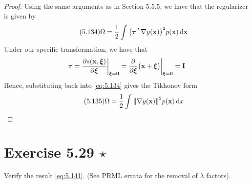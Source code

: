 \vspace{1em}

\begin{proof}
    Using the same arguments as in Section 5.5.5, we have that the regularizer
    is given by
    \begin{equation}\label{eq:5.134}\tag{5.134}
        \Omega = \frac{1}{2} \int_{}^{} \big(\bm{\tau}^T 
        \nabla y(\mathbf{x})\big)^2 p(\mathbf{x}) \mathop{}\!\mathrm{d} \mathbf{x}
    \end{equation}
    Under our specific transformation, we have that
    \[
        \bm{\tau} = \pdv{s(\mathbf{x}, \bm{\xi})}{\bm{\xi}} \bigg|_{\bm{\xi} = \bm{0}}
        = \pdv{\bm{\xi}} \big(\mathbf{x} + \bm{\xi}\big) \bigg|_{\bm{\xi} = \bm{0}}
        = \mathbf{I}
    \] 
    Hence, substituting back into \eqref{eq:5.134} gives the Tikhonov form
    \begin{equation}\label{eq:5.135}\tag{5.135}
        \Omega = \frac{1}{2} \int_{}^{} \norm{\nabla y(\mathbf{x})}^2 p(\mathbf{x}) \mathop{}\!\mathrm{d} x
    \end{equation}
\end{proof}

\section*{Exercise 5.29 $\star$}
Verify the result \eqref{eq:5.141}. (See PRML errata for the removal of $\lambda$ factors).

\vspace{1em}

